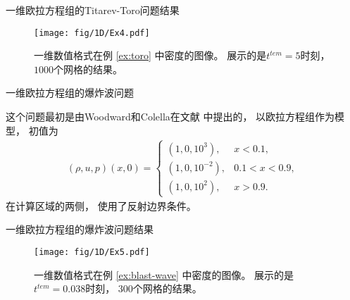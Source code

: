 \documentclass[aspectratio=169]{beamer}
\begin{document}
\begin{frame}{一维欧拉方程组的Titarev-Toro问题结果}
  
  \begin{figure}[htbp]
    \centering
    \texttt{[image: fig/1D/Ex4.pdf]}
    \caption{一维数值格式在例 \ref{ex:toro} 中密度的图像。
      展示的是$t^{tem} = 5$时刻，
      $1000$个网格的结果。
    }
    \label{fig:4_1}
  \end{figure}
  
\end{frame}

\begin{frame}{一维欧拉方程组的爆炸波问题}
  
  \begin{example}[一维欧拉方程组的爆炸波问题]
    \label{ex:blast-wave}
    这个问题最初是由Woodward和Colella在文献 \citep{frontStep-BlastProblem} 中提出的，
    以欧拉方程组作为模型，
    初值为
    \begin{equation*}
      \begin{aligned}
        (\rho,u,p)(x,0)=
        \begin{cases}
          (1,0,10^3),    & x<0.1,     \\
          (1,0,10^{-2}), & 0.1<x<0.9, \\
          (1,0,10^2),    & x>0.9.
        \end{cases}
      \end{aligned}
    \end{equation*}
    在计算区域的两侧，
    使用了反射边界条件。
  \end{example}
  
\end{frame}

\begin{frame}{一维欧拉方程组的爆炸波问题结果}
  
  \begin{figure}[htbp]
    \centering
    \texttt{[image: fig/1D/Ex5.pdf]}
    \caption{一维数值格式在例 \ref{ex:blast-wave} 中密度的图像。
      展示的是$t^{tem} = 0.038$时刻，
      $300$个网格的结果。
    }
    \label{fig:5_1}
  \end{figure}
  
\end{frame}
\end{document}
